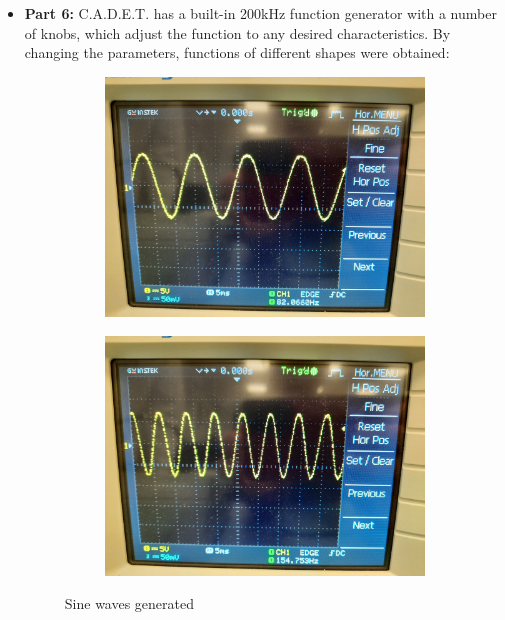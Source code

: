 \documentclass[pdftex,12pt,a4paper]{article}
\begin{document}
\begin{itemize}
\end{itemize}

\begin{itemize}
    \item \textbf{Part 6:}
    C.A.D.E.T. has a built-in 200kHz function generator with a number of knobs, which adjust the function to any desired characteristics. By changing the parameters, functions of different shapes were obtained:
    
\begin{figure}
\begin{subfigure}{0.5\textwidth}
\centering
\includegraphics[width=.95\linewidth]{sine_wave_1.jpg}
\end{subfigure}%
\begin{subfigure}{0.5\textwidth}
\centering
\includegraphics[width=.95\linewidth]{sine_wave_2.jpg}
\end{subfigure}
\caption{Sine waves generated}
\end{figure}


\end{itemize}
\end{document}
